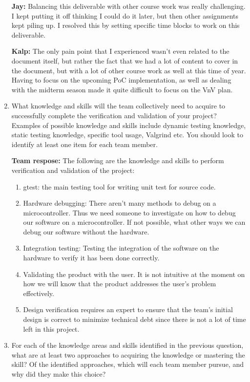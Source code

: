 \documentclass[12pt, titlepage]{article}
\begin{document}
\begin{enumerate}
  \textbf{Jay:} Balancing this deliverable with other course work was really challenging. 
  I kept putting it off thinking I could do it later, but then other assignments kept piling up. 
  I resolved this by setting specific time blocks to work on this deliverable.

  \textbf{Kalp:} The only pain point that I experienced wasn't even related to
  the document itself, but rather the fact that we had a lot of content to cover
  in the document, but with a lot of other course work as well at this time of
  year. Having to focus on the upcoming PoC implementation, as well as dealing 
  with the midterm season made it quite difficult to focus on the VnV plan.

  \item What knowledge and skills will the team collectively need to acquire to
  successfully complete the verification and validation of your project?
  Examples of possible knowledge and skills include dynamic testing knowledge,
  static testing knowledge, specific tool usage, Valgrind etc.  You should look
  to identify at least one item for each team member.
  
  \textbf{Team respose:} The following are the knowledge and skills to perform
  verification and validation of the project:

  \begin{enumerate}
    \item gtest: the main testing tool for writing unit test for source code.
    \item Hardware debugging: There aren't many methods to debug on a
    microcontroller. Thus we need someone to investigate on how to debug our
    software on a microcontroller. If not possible, what other ways we can debug
    our software without the hardware.
    \item Integration testing: Testing the integration of the software on the
    hardware to verify it has been done correctly.
    \item Validating the product with the user. It is not intuitive at the
    moment on how we will know that the product addresses the user's problem
    effectively.
    \item Design verification requires an expert to ensure that the team's
    initial design is correct to minimize technical debt since there is not
    a lot of time left in this project.
  \end{enumerate}

  \item For each of the knowledge areas and skills identified in the previous
  question, what are at least two approaches to acquiring the knowledge or
  mastering the skill?  Of the identified approaches, which will each team
  member pursue, and why did they make this choice?


\end{enumerate}
\end{document}
